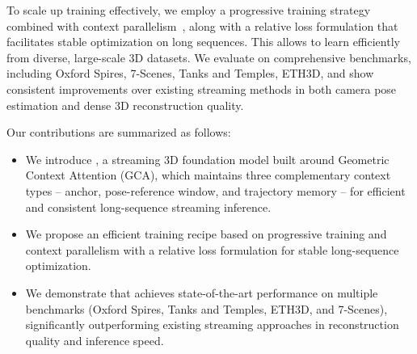 To scale up training effectively, we employ a progressive training strategy combined with context parallelism~\cite{jacobs2023deepspeed}, along with a relative loss formulation that facilitates stable optimization on long sequences.
This allows \method to learn efficiently from diverse, large-scale 3D datasets.
We evaluate \method on comprehensive benchmarks, including Oxford Spires, 7-Scenes, Tanks and Temples, ETH3D, and show consistent improvements over existing streaming methods in both camera pose estimation and dense 3D reconstruction quality.

Our contributions are summarized as follows:
\begin{itemize}
    \item We introduce \method, a streaming 3D foundation model built around Geometric Context Attention (GCA), which maintains three complementary context types -- anchor, pose-reference window, and trajectory memory -- for efficient and consistent long-sequence streaming inference.
    \item We propose an efficient training recipe based on progressive training and context parallelism with a relative loss formulation for stable long-sequence optimization.
    \item We demonstrate that \method achieves state-of-the-art performance on multiple benchmarks (Oxford Spires, Tanks and Temples, ETH3D, and 7-Scenes), significantly outperforming existing streaming approaches in reconstruction quality and inference speed.
\end{itemize}
 






